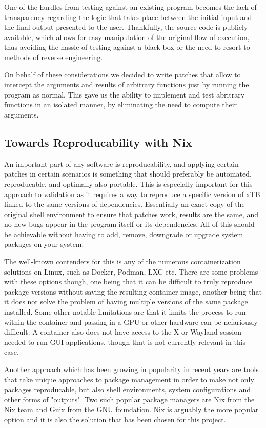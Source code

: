One of the hurdles from testing against an existing program becomes the lack of transparency regarding the logic that takes place between the initial input and the final output presented to the user. Thankfully, the source code is publicly available, which allows for easy manipulation of the original flow of execution, thus avoiding the hassle of testing against a black box or the need to resort to methods of reverse engineering.

On behalf of these considerations we decided to write patches that allow to intercept the arguments and results of arbitrary functions just by running the program as normal. This gave us the ability to implement and test abritrary functions in an isolated manner, by eliminating the need to compute their arguments.

\subsection{Towards Reproducability with Nix}

An important part of any software is reproducability, and applying certain patches in certain scenarios is something that should preferably be automated, reproducable, and optimally also portable. This is especially important for this approach to validation as it requires a way to reproduce a specific version of xTB linked to the same versions of dependencies. Essentially an exact copy of the original shell environment to ensure that patches work, results are the same, and no new bugs appear in the program itself or its dependencies. All of this should be achievable without having to add, remove, downgrade or upgrade system packages on your system.

The well-known contenders for this is any of the numerous containerization solutions on Linux, such as Docker, Podman, LXC etc. There are some problems with these options though, one being that it can be difficult to truly reproduce package versions without saving the resulting container image, another being that it does not solve the problem of having multiple versions of the same package installed. Some other notable limitations are that it limits the process to run within the container and passing in a GPU or other hardware can be nefariously difficult. A container also does not have access to the X or Wayland session needed to run GUI applications, though that is not currently relevant in this case.

Another approach which has been growing in popularity in recent years are tools that take unique approaches to package management in order to make not only packages reproducable, but also shell environments, system configurations and other forms of "outputs". Two such popular package managers are Nix from the Nix team and Guix from the GNU foundation. Nix is arguably the more popular option and it is also the solution that has been chosen for this project.

